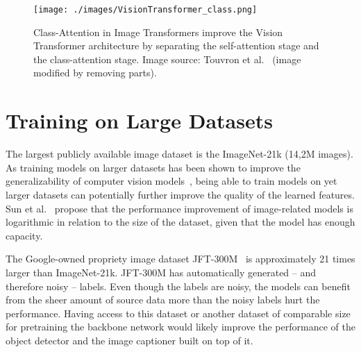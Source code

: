 \documentclass[english,twoside,openright]{HYgraduMLDS}
\begin{document}
\begin{figure}[h] 
\centering
\texttt{[image: ./images/VisionTransformer\_class.png]}
\caption{Class-Attention in Image Transformers improve the Vision Transformer architecture by separating the self-attention stage and the class-attention stage. Image source: Touvron et al.~\cite{DeeperImageTransformers} (image modified by removing parts).}
\label{fig:Vision_transformer_class} 
\end{figure}

\section{Training on Large Datasets}
\label{section:LargeDatasets}
The largest publicly available image dataset is the ImageNet-21k (14,2M images). As training models on larger datasets has been shown to improve the generalizability of computer vision models~\cite{BottomUp, VisionTransformers}, being able to train models on yet larger datasets can potentially further improve the quality of the learned features. Sun et al.~\cite{JFT} propose that the performance improvement of image-related models is logarithmic in relation to the size of the dataset, given that the model has enough capacity.

The Google-owned propriety image dataset JFT-300M~\cite{JFT} is approximately 21 times larger than ImageNet-21k. JFT-300M has automatically generated -- and therefore noisy -- labels. Even though the labels are noisy, the models can benefit from the sheer amount of source data more than the noisy labels hurt the performance. Having access to this dataset or another dataset of comparable size for pretraining the backbone network would likely improve the performance of the object detector and the image captioner built on top of it. 
\end{document}
